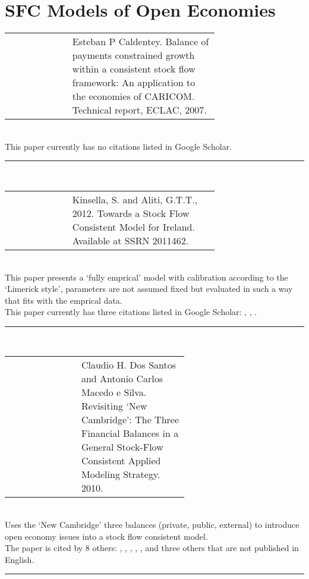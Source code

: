 \documentclass[twoside,a4paper,11pt]{article}
\begin{document}
 \section{SFC Models of Open Economies}
\begin{tabular}{lp{0.7\linewidth}}
\cite{Caldentey2007}  & Esteban P Caldentey. Balance of payments constrained growth within a consistent stock flow framework: An application to the economies of CARICOM. Technical report, ECLAC, 2007.
\end{tabular}\\[5pt]
This paper currently has no citations listed in Google Scholar.\\
\begin{center}
\rule{10cm}{1pt}   \\[5pt]
\end{center}

\begin{tabular}{lp{0.7\linewidth}}
\cite{Kinsella2012b}  & Kinsella, S. and Aliti, G.T.T., 2012. Towards a Stock Flow Consistent Model for Ireland. Available at SSRN 2011462.
\end{tabular}\\[5pt]
This paper presents a `fully emprical' model with calibration according to the `Limerick style', parameters are not assumed fixed but evaluated in such a way that fits with the emprical data.\\[5pt]
This paper currently has three citations listed in Google Scholar:
  \cite{Caverzasi2013},
  \cite{Caverzasi2014a},
  \cite{Grydaki2013}.
\begin{center}
\rule{10cm}{1pt}   \\[5pt]
\end{center}

\begin{tabular}{lp{0.6\linewidth}}
\cite{DosSantos2010} & Claudio H. Dos Santos and Antonio Carlos Macedo e Silva. Revisiting `New Cambridge': The Three Financial Balances in a General Stock-Flow Consistent Applied Modeling Strategy. 2010.
\end{tabular}\\[5pt]
Uses the `New Cambridge'  three balances (private, public, external) to introduce open economy issues into a stock flow consistent model.\\[5pt]
The paper is cited by 8 others:
  \cite{Cripps2011},
  \cite{Shaikh2012},
  \cite{Dafermos2015a},
  \cite{Leite2015},
  \cite{Michell2012},
  and three others that are not published in English.
\begin{center}
\rule{10cm}{1pt}   \\[5pt]
\end{center}
\end{document}
